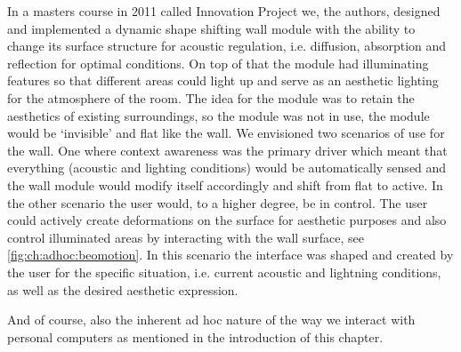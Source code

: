 In a masters course in 2011 called Innovation Project \cite{innoproj2011, beomotionreportstefan, beomotionreporttore}  we, the authors, designed and implemented a dynamic shape shifting wall module with the ability to change its surface structure for acoustic regulation, i.e. diffusion, absorption and reflection for optimal conditions.
On top of that the module had illuminating features so that different areas could light up and serve as an aesthetic lighting for the atmosphere of the room.
The idea for the module was to retain the aesthetics of existing surroundings, so the module was not in use, the module would be `invisible' and flat like the wall.  
We envisioned two scenarios of use for the wall.
One where context awareness was the primary driver which meant that everything (acoustic and lighting conditions) would be automatically sensed and the wall module would modify itself accordingly and shift from flat to active.
In the other scenario the user would, to a higher degree, be in control.
The user could actively create deformations on the surface for aesthetic purposes and also control illuminated areas by interacting with the wall surface, see \ref{fig:ch:adhoc:beomotion}.
In this scenario the interface was shaped and created by the user for the specific situation, i.e. current acoustic and lightning conditions, as well as the desired aesthetic expression. 

 And of course, also the inherent ad hoc nature of the way we interact with personal computers as mentioned in the introduction of this chapter.
\blank
{} 

